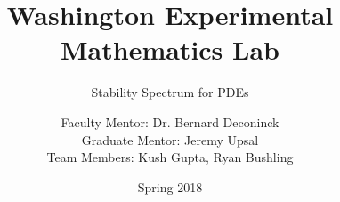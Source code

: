 \documentclass{beamer}
\title
{Washington Experimental Mathematics Lab} %
\subtitle
{Stability Spectrum for PDEs}
\date{Spring 2018}
\author{Faculty Mentor: Dr. Bernard Deconinck \\ Graduate Mentor: Jeremy Upsal \\ Team Members: Kush Gupta, Ryan Bushling}
\institute[University of Washington] %
{
  Department of Mathematics\\
  University of Washington}
\begin{document}
\begin{frame}
  \titlepage
\end{frame}










\end{document}
